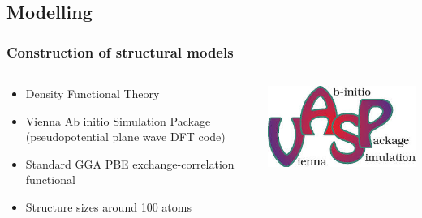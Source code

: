 \documentclass[noamsthm,8pt,t,xcolor={dvipsnames}]{beamer}
\begin{document}
\subsection{Modelling}
\begin{frame}
   \frametitle{Construction of structural models}
   \vspace{-0.3cm}
   \begin{columns}
      \begin{column}{0.8\textwidth}
         \begin{itemize}
            \item Density Functional Theory
            \item Vienna Ab initio Simulation Package (pseudopotential plane wave DFT code)
            \item Standard GGA PBE exchange-correlation functional
            \item Structure sizes around 100 atoms
         \end{itemize}
      \end{column}
      \begin{column}{0.2\textwidth}
         \begin{center}
            \includegraphics[width=0.9\linewidth]{figures/VASP.jpg}
         \end{center}
      \end{column}
   \end{columns}

   \pause


\end{frame}
\end{document}
